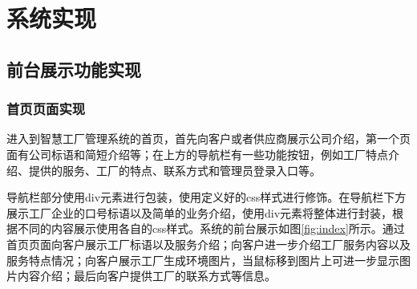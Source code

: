 \section{系统实现}

\subsection{前台展示功能实现}

\subsubsection{首页页面实现}

进入到智慧工厂管理系统的首页，首先向客户或者供应商展示公司介绍，第一个页面有公司标语和简短介绍等；在上方的导航栏有一些功能按钮，例如工厂特点介绍、提供的服务、工厂的特点、联系方式和管理员登录入口等。

导航栏部分使用div元素进行包装，使用定义好的css样式进行修饰。在导航栏下方展示工厂企业的口号标语以及简单的业务介绍，使用div元素将整体进行封装，根据不同的内容展示使用各自的css样式。系统的前台展示如图\ref{fig:index}所示。通过首页页面向客户展示工厂标语以及服务介绍；向客户进一步介绍工厂服务内容以及服务特点情况；向客户展示工厂生成环境图片，当鼠标移到图片上可进一步显示图片内容介绍；最后向客户提供工厂的联系方式等信息。

